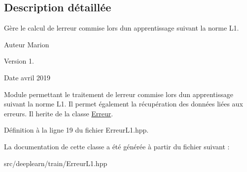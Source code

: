 \subsection{Description détaillée}
Gère le calcul de l\textquotesingle{}erreur commise lors d\textquotesingle{}un apprentissage suivant la norme L1. 

\begin{DoxyAuthor}{Auteur}
Marion 
\end{DoxyAuthor}
\begin{DoxyVersion}{Version}
1. 
\end{DoxyVersion}
\begin{DoxyDate}{Date}
avril 2019
\end{DoxyDate}
Module permettant le traitement de l\textquotesingle{}erreur commise lors d\textquotesingle{}un apprentissage suivant la norme L1. Il permet également la récupération des données liées aux erreurs. Il herite de la classe \hyperlink{class_erreur}{Erreur}. 

Définition à la ligne 19 du fichier Erreur\+L1.\+hpp.



La documentation de cette classe a été générée à partir du fichier suivant \+:\begin{DoxyCompactItemize}
\item 
src/deeplearn/train/Erreur\+L1.\+hpp\end{DoxyCompactItemize}
